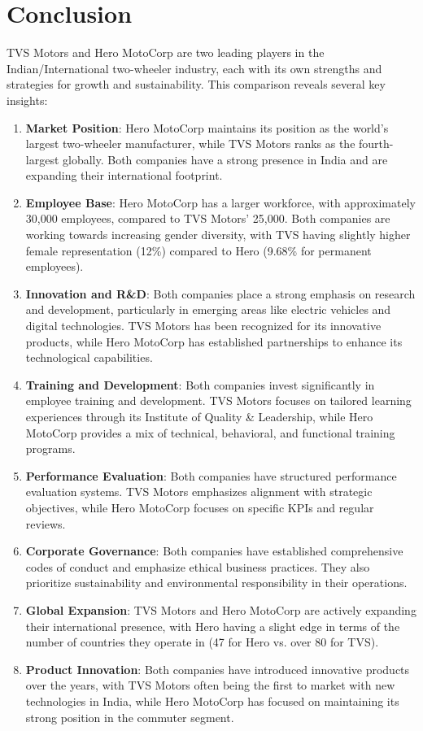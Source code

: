 \section{Conclusion}
TVS Motors and Hero MotoCorp are two leading players in the Indian/International two-wheeler industry, each with its own strengths and strategies for growth and sustainability. This comparison reveals several key insights:

\begin{enumerate}
	
\item \textbf{Market Position}: Hero MotoCorp maintains its position as the world's largest two-wheeler manufacturer, while TVS Motors ranks as the fourth-largest globally. Both companies have a strong presence in India and are expanding their international footprint.
\item \textbf{Employee Base}: Hero MotoCorp has a larger workforce, with approximately 30,000 employees, compared to TVS Motors' 25,000. Both companies are working towards increasing gender diversity, with TVS having slightly higher female representation (12\%) compared to Hero (9.68\% for permanent employees).
\item \textbf{Innovation and R\&D}: Both companies place a strong emphasis on research and development, particularly in emerging areas like electric vehicles and digital technologies. TVS Motors has been recognized for its innovative products, while Hero MotoCorp has established partnerships to enhance its technological capabilities.
\item \textbf{Training and Development}: Both companies invest significantly in employee training and development. TVS Motors focuses on tailored learning experiences through its Institute of Quality \& Leadership, while Hero MotoCorp provides a mix of technical, behavioral, and functional training programs.
\item \textbf{Performance Evaluation}: Both companies have structured performance evaluation systems. TVS Motors emphasizes alignment with strategic objectives, while Hero MotoCorp focuses on specific KPIs and regular reviews.
\item \textbf{Corporate Governance}: Both companies have established comprehensive codes of conduct and emphasize ethical business practices. They also prioritize sustainability and environmental responsibility in their operations.
\item \textbf{Global Expansion}: TVS Motors and Hero MotoCorp are actively expanding their international presence, with Hero having a slight edge in terms of the number of countries they operate in (47 for Hero vs. over 80 for TVS).
\item \textbf{Product Innovation}: Both companies have introduced innovative products over the years, with TVS Motors often being the first to market with new technologies in India, while Hero MotoCorp has focused on maintaining its strong position in the commuter segment.

\end{enumerate}

